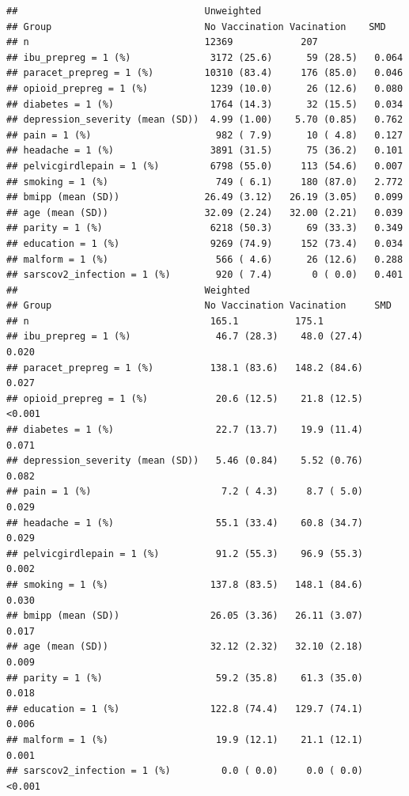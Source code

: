 \documentclass[
]{article}
\begin{document}
\begin{verbatim}
##                                 Unweighted                         
## Group                           No Vaccination Vacination    SMD   
## n                               12369            207               
## ibu_prepreg = 1 (%)              3172 (25.6)      59 (28.5)   0.064
## paracet_prepreg = 1 (%)         10310 (83.4)     176 (85.0)   0.046
## opioid_prepreg = 1 (%)           1239 (10.0)      26 (12.6)   0.080
## diabetes = 1 (%)                 1764 (14.3)      32 (15.5)   0.034
## depression_severity (mean (SD))  4.99 (1.00)    5.70 (0.85)   0.762
## pain = 1 (%)                      982 ( 7.9)      10 ( 4.8)   0.127
## headache = 1 (%)                 3891 (31.5)      75 (36.2)   0.101
## pelvicgirdlepain = 1 (%)         6798 (55.0)     113 (54.6)   0.007
## smoking = 1 (%)                   749 ( 6.1)     180 (87.0)   2.772
## bmipp (mean (SD))               26.49 (3.12)   26.19 (3.05)   0.099
## age (mean (SD))                 32.09 (2.24)   32.00 (2.21)   0.039
## parity = 1 (%)                   6218 (50.3)      69 (33.3)   0.349
## education = 1 (%)                9269 (74.9)     152 (73.4)   0.034
## malform = 1 (%)                   566 ( 4.6)      26 (12.6)   0.288
## sarscov2_infection = 1 (%)        920 ( 7.4)       0 ( 0.0)   0.401
##                                 Weighted                            
## Group                           No Vaccination Vacination     SMD   
## n                                165.1          175.1               
## ibu_prepreg = 1 (%)               46.7 (28.3)    48.0 (27.4)   0.020
## paracet_prepreg = 1 (%)          138.1 (83.6)   148.2 (84.6)   0.027
## opioid_prepreg = 1 (%)            20.6 (12.5)    21.8 (12.5)  <0.001
## diabetes = 1 (%)                  22.7 (13.7)    19.9 (11.4)   0.071
## depression_severity (mean (SD))   5.46 (0.84)    5.52 (0.76)   0.082
## pain = 1 (%)                       7.2 ( 4.3)     8.7 ( 5.0)   0.029
## headache = 1 (%)                  55.1 (33.4)    60.8 (34.7)   0.029
## pelvicgirdlepain = 1 (%)          91.2 (55.3)    96.9 (55.3)   0.002
## smoking = 1 (%)                  137.8 (83.5)   148.1 (84.6)   0.030
## bmipp (mean (SD))                26.05 (3.36)   26.11 (3.07)   0.017
## age (mean (SD))                  32.12 (2.32)   32.10 (2.18)   0.009
## parity = 1 (%)                    59.2 (35.8)    61.3 (35.0)   0.018
## education = 1 (%)                122.8 (74.4)   129.7 (74.1)   0.006
## malform = 1 (%)                   19.9 (12.1)    21.1 (12.1)   0.001
## sarscov2_infection = 1 (%)         0.0 ( 0.0)     0.0 ( 0.0)  <0.001
\end{verbatim}
\end{document}
